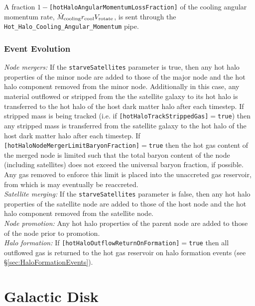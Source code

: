 A fraction $1-${\tt [hotHaloAngularMomentumLossFraction]} of the cooling angular momentum rate, $\dot{M}_{\rm cooling} r_{\rm cool} V_{\rm rotate}$, is sent through the {\tt Hot\_Halo\_Cooling\_Angular\_Momentum} pipe.

\subsubsection{Event Evolution}

\noindent\emph{Node mergers:} If the {\tt starveSatellites} parameter is true, then any hot halo properties of the minor \gls{node} are added to those of the major \gls{node} and the hot halo \gls{component} removed from the minor node. Additionally in this case, any material outflowed or stripped from the the satellite galaxy to its hot halo is transferred to the hot halo of the host dark matter halo after each timestep. If stripped mass is being tracked (i.e. if {\tt [hotHaloTrackStrippedGas]}$=${\tt true}) then any stripped mass is transferred from the satellite galaxy to the hot halo of the host dark matter halo after each timestep. If {\tt [hotHaloNodeMergerLimitBaryonFraction]}$=${\tt true} then the hot gas content of the merged node is limited such that the total baryon content of the node (including satellites) does not exceed the universal baryon fraction, if possible. Any gas removed to enforce this limit is placed into the unaccreted gas reservoir, from which is may eventually be reaccreted.\\

\noindent\emph{Satellite merging:} If the {\tt starveSatellites} parameter is false, then any hot halo properties of the satellite \gls{node} are added to those of the host \gls{node} and the hot halo \gls{component} removed from the satellite node.\\

\noindent\emph{Node promotion:} Any hot halo properties of the parent \gls{node} are added to those of the \gls{node} prior to promotion.\\

\noindent\emph{Halo formation:} If {\tt [hotHaloOutflowReturnOnFormation]}$=${\tt true} then all outflowed gas is returned to the hot gas reservoir on halo formation events (see \S\ref{sec:HaloFormationEvents}).\\


\section{Galactic Disk}

